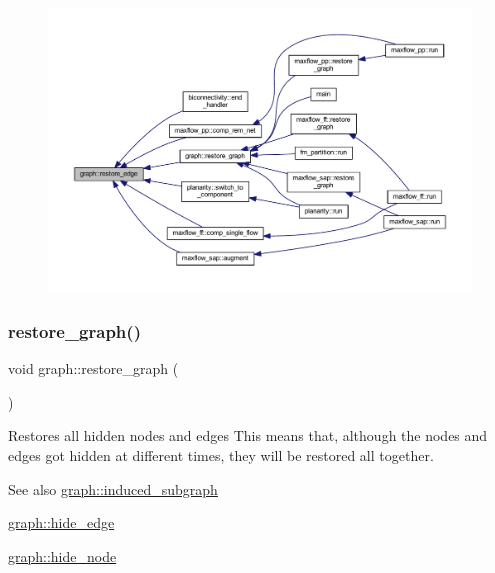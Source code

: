 \begin{figure}[H]
\begin{center}
\leavevmode
\includegraphics[width=350pt]{classgraph_a2e5426682a0897b9f9104b019970bedc_icgraph}
\end{center}
\end{figure}
\mbox{\label{classgraph_a53e2a5505fa6427587e12d66e4a86cec}} 
\subsubsection{\texorpdfstring{restore\+\_\+graph()}{restore\_graph()}}
{\footnotesize\ttfamily void graph\+::restore\+\_\+graph (\begin{DoxyParamCaption}{ }\end{DoxyParamCaption})\hspace{0.3cm}{\ttfamily [inherited]}}

Restores all hidden nodes and edges This means that, although the nodes and edges got hidden at different times, they will be restored all together.

\begin{DoxySeeAlso}{See also}
\mbox{\hyperlink{classgraph_a15b766094bb0b97ef53e06e7c26b2197}{graph\+::induced\+\_\+subgraph}} 

\mbox{\hyperlink{classgraph_ab2f8520bcac080d73c55228fecc61825}{graph\+::hide\+\_\+edge}} 

\mbox{\hyperlink{classgraph_a214618b5e3c02695779350532506e225}{graph\+::hide\+\_\+node}} 
\end{DoxySeeAlso}


